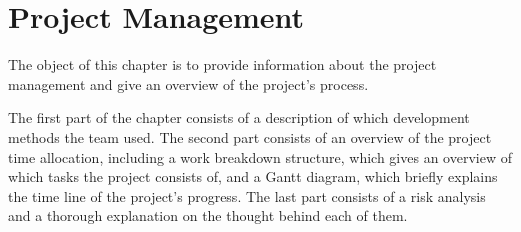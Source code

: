 \chapter{Project Management}

The object of this chapter is to provide information about the project management and give an overview of the project's process. 

The first part of the chapter consists of a description of which development methods the team used. The second part consists of an overview of the project time allocation, including a work breakdown structure, which gives an overview of which tasks the project consists of, and a Gantt diagram, which briefly explains the time line of the project's progress. The last part consists of a risk analysis and a thorough explanation on the thought behind each of them.




\newpage



